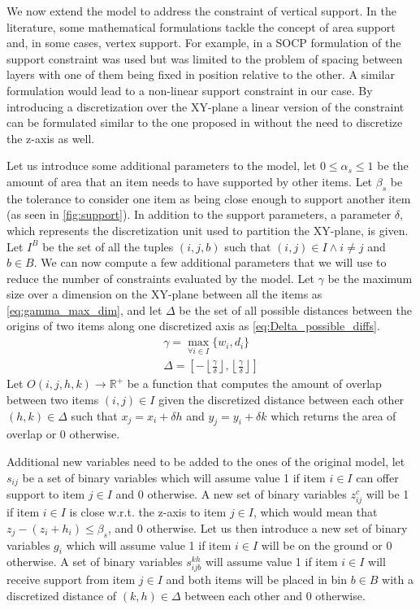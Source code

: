 We now extend the model to address the constraint of vertical support. 
In the literature, some mathematical formulations tackle the concept of area support and, in some cases, vertex support. For example, in \citeauthor{elhedhli2019three} a SOCP formulation of the support constraint was used but was limited to the problem of spacing between layers with one of them being fixed in position relative to the other. A similar formulation would lead to a non-linear support constraint in our case.
By introducing a discretization over the XY-plane a linear version of the constraint can be formulated similar to the one proposed in \citeauthor{kurpel2020exact} without the need to discretize the z-axis as well.

Let us introduce some additional parameters to the model, let $0 \le \alpha_s \le 1$ be the amount of area that an item needs to have supported by other items. Let $\beta_s$ be the tolerance to consider one item as being close enough to support another item (as seen in \cref{fig:support}).
In addition to the support parameters, a parameter $\delta$, which represents the discretization unit used to partition the XY-plane, is given. Let $I^B$ be the set of all the tuples $(i, j, b)$ such that $(i,j) \in I \land i \neq j$ and $b \in B$.
We can now compute a few additional parameters that we will use to reduce the number of constraints evaluated by the model. Let $\gamma$ be the maximum size over a dimension on the XY-plane between all the items as \cref{eq:gamma_max_dim}, and let $\Delta$ be the set of all possible distances between the origins of two items along one discretized axis as \cref{eq:Delta_possible_diffs}.
\begin{align}
    \gamma = \max_{\forall i \in I}\{ w_i, d_i \} \label{eq:gamma_max_dim} \\
    \Delta =  \left[ - \left\lfloor \frac{ \gamma }{\delta} \right\rfloor, \left\lfloor \frac{ \gamma }{\delta} \right\rfloor \right] \label{eq:Delta_possible_diffs}
\end{align}
Let $O(i, j, h, k) \rightarrow \mathbb{R}^+$ be a function that computes the amount of overlap between two items $(i,j) \in I$ given the discretized distance between each other $(h, k) \in \Delta$ such that $x_j = x_i + \delta h$ and $y_j = y_i + \delta k$ which returns the area of overlap or 0 otherwise.

Additional new variables need to be added to the ones of the original model, let $s_{ij}$ be a set of binary variables which will assume value 1 if item $i \in I$ can offer support to item $j \in I$ and 0 otherwise. A new set of binary variables $z^c_{ij}$ will be 1 if item $i \in I$ is close w.r.t. the z-axis to item $j \in I$, which would mean that $z_j - (z_i + h_i) \le \beta_s$, and 0 otherwise.
Let us then introduce a new set of binary variables $g_i$ which will assume value 1 if item $i \in I$ will be on the ground or 0 otherwise. A set of binary variables $s^{kh}_{i j b}$ will assume value 1 if item $i \in I$ will receive support from item $j \in I$ and both items will be placed in bin $b \in B$ with a discretized distance of $(k, h) \in \Delta$ between each other and 0 otherwise.


